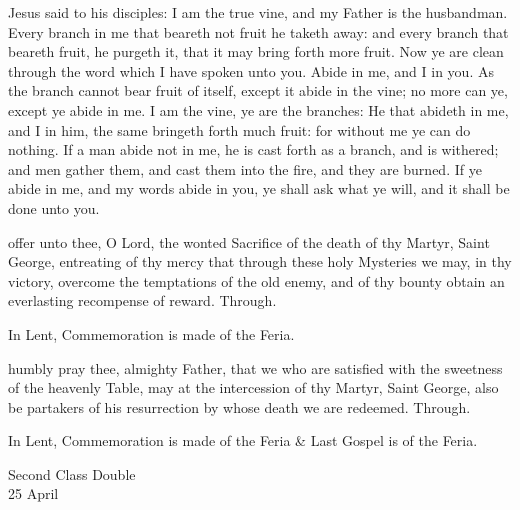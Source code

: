  Jesus said to his disciples: I am the true vine, and my Father is the husbandman. Every branch in me that beareth not fruit he taketh away: and every branch that beareth fruit, he purgeth it, that it may bring forth more fruit. Now ye are clean through the word which I have spoken unto you. Abide in me, and I in you. As the branch cannot bear fruit of itself, except it abide in the vine; no more can ye, except ye abide in me. I am the vine, ye are the branches: He that abideth in me, and I in him, the same bringeth forth much fruit: for without me ye can do nothing. If a man abide not in me, he is cast forth as a branch, and is withered; and men gather them, and cast them into the fire, and they are burned. If ye abide in me, and my words abide in you, ye shall ask what ye will, and it shall be done unto you.

\secret
{} offer unto thee, O Lord, the wonted Sacrifice of the death of thy Martyr, Saint George, entreating of thy mercy that through these holy Mysteries we may, in thy victory, overcome the temptations of the old enemy, and of thy bounty obtain an everlasting recompense of reward. Through.
\begin{rubric}
    In Lent, Commemoration is made of the Feria.%
\end{rubric}


\postcommunion
{} humbly pray thee, almighty Father, that we who are satisfied with the sweetness of the heavenly Table, may at the intercession of thy Martyr, Saint George, also be partakers of his resurrection by whose death we are redeemed. Through.
\begin{rubric}
    In Lent, Commemoration is made of the Feria \& Last Gospel is of the Feria.
\end{rubric}

\clearpage
{}
\begin{inhead}
    {Second Class Double\\
25 April}
\end{inhead}

